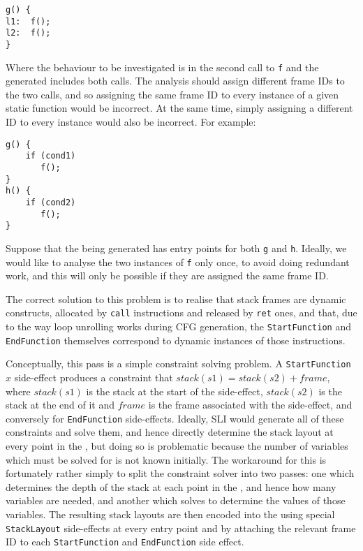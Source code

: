 \begin{verbatim}
g() {
l1:  f();
l2:  f();
}
\end{verbatim}

Where the behaviour to be investigated is in the second call to
\verb|f| and the \StateMachine generated includes both calls.  The
analysis should assign different frame IDs to the two calls, and so
assigning the same frame ID to every instance of a given static
function would be incorrect.  At the same time, simply assigning a
different ID to every instance would also be incorrect.  For example:

\begin{verbatim}
g() {
    if (cond1)
       f();
}
h() {
    if (cond2)
       f();
}
\end{verbatim}

Suppose that the \StateMachine being generated has entry points for
both \verb|g| and \verb|h|.  Ideally, we would like to analyse the two
instances of \verb|f| only once, to avoid doing redundant work, and
this will only be possible if they are assigned the same frame ID.

The correct solution to this problem is to realise that stack frames
are dynamic constructs, allocated by \verb|call| instructions and
released by \verb|ret| ones, and that, due to the way loop unrolling
works during CFG generation\needCite{}, the \verb|StartFunction| and
\verb|EndFunction| themselves correspond to dynamic instances of those
instructions.


Conceptually, this pass is a simple constraint solving problem.  A
\verb|StartFunction| $x$ side-effect produces a constraint that
$stack(s1) = stack(s2) + frame$, where $stack(s1)$ is the stack at the
start of the side-effect, $stack(s2)$ is the stack at the end of it
and $frame$ is the frame associated with the side-effect, and
conversely for \verb|EndFunction| side-effects.  Ideally, SLI would
generate all of these constraints and solve them, and hence directly
determine the stack layout at every point in the \StateMachine, but
doing so is problematic because the number of variables which must be
solved for is not known initially.  The workaround for this is
fortunately rather simply to split the constraint solver into two
passes: one which determines the depth of the stack at each point in
the \StateMachine, and hence how many variables are needed, and
another which solves to determine the values of those variables.  The
resulting stack layouts are then encoded into the \StateMachine using
special \verb|StackLayout| side-effects at every entry point and by
attaching the relevant frame ID to each \verb|StartFunction| and
\verb|EndFunction| side effect.

